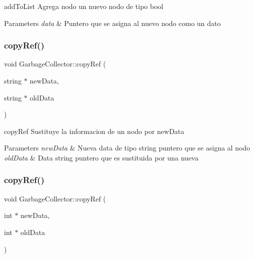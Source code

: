add\+To\+List Agrega nodo un nuevo nodo de tipo bool 


\begin{DoxyParams}{Parameters}
{\em data} & Puntero que se asigna al nuevo nodo como un dato \\
\hline
\end{DoxyParams}
\mbox{\label{class_garbage_collector_ab54fe91f0393b678444ed6ef353635b5}} 
\subsubsection{\texorpdfstring{copy\+Ref()}{copyRef()}\hspace{0.1cm}{\footnotesize\ttfamily [1/3]}}
{\footnotesize\ttfamily void Garbage\+Collector\+::copy\+Ref (\begin{DoxyParamCaption}\item[{string $\ast$}]{new\+Data,  }\item[{string $\ast$}]{old\+Data }\end{DoxyParamCaption})}



copy\+Ref Sustituye la informacion de un nodo por new\+Data 


\begin{DoxyParams}{Parameters}
{\em new\+Data} & Nueva data de tipo string puntero que se asigna al nodo \\
\hline
{\em old\+Data} & Data string puntero que es sustituida por una nueva \\
\hline
\end{DoxyParams}
\mbox{\label{class_garbage_collector_a99d3d8fc5d5b7bd13bbe58f4d1b07334}} 
\subsubsection{\texorpdfstring{copy\+Ref()}{copyRef()}\hspace{0.1cm}{\footnotesize\ttfamily [2/3]}}
{\footnotesize\ttfamily void Garbage\+Collector\+::copy\+Ref (\begin{DoxyParamCaption}\item[{int $\ast$}]{new\+Data,  }\item[{int $\ast$}]{old\+Data }\end{DoxyParamCaption})}




